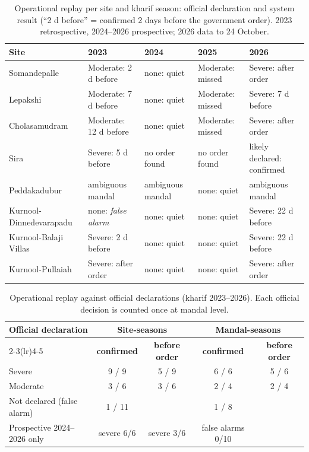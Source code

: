 \documentclass[11pt,a4paper,oneside]{article}
\begin{document}
\begin{table}[H]
\centering
\caption{Operational replay per site and kharif season: official declaration and system result (``2 d before'' = confirmed 2 days before the government order). 2023 retrospective, 2024--2026 prospective; 2026 data to 24 October.}
\label{tab:s_replay_sites}
\footnotesize
\begin{tabular}{@{}lllll@{}}
\toprule
\textbf{Site} & \textbf{2023} & \textbf{2024} & \textbf{2025} & \textbf{2026} \\
\midrule
Somandepalle & Moderate: 2 d before & none: quiet & Moderate: missed & Severe: after order \\
Lepakshi & Moderate: 7 d before & none: quiet & Moderate: missed & Severe: 7 d before \\
Cholasamudram & Moderate: 12 d before & none: quiet & Moderate: missed & Severe: after order \\
Sira & Severe: 5 d before & no order found & no order found & likely declared: confirmed \\
Peddakadubur & ambiguous mandal & ambiguous mandal & none: quiet & ambiguous mandal \\
Kurnool-Dinnedevarapadu & none: \textit{false alarm} & none: quiet & none: quiet & Severe: 22 d before \\
Kurnool-Balaji Villas & Severe: 2 d before & none: quiet & none: quiet & Severe: 22 d before \\
Kurnool-Pullaiah & Severe: after order & none: quiet & none: quiet & Severe: after order \\
\bottomrule
\end{tabular}
\end{table}


\begin{table}[H]
\centering
\caption{Operational replay against official declarations (kharif 2023--2026). Each official decision is counted once at mandal level.}
\label{tab:replay}
\small
\begin{tabular}{@{}lcccc@{}}
\toprule
\multirow{2}{*}{\textbf{Official declaration}} & \multicolumn{2}{c}{\textbf{Site-seasons}} & \multicolumn{2}{c}{\textbf{Mandal-seasons}} \\
\cmidrule(lr){2-3}\cmidrule(lr){4-5}
 & \textbf{confirmed} & \textbf{before order} & \textbf{confirmed} & \textbf{before order} \\
\midrule
Severe & 9 / 9 & 5 / 9 & 6 / 6 & 5 / 6 \\
Moderate & 3 / 6 & 3 / 6 & 2 / 4 & 2 / 4 \\
Not declared (false alarm) & 1 / 11 & & 1 / 8 & \\
Prospective 2024--2026 only & severe 6/6 & severe 3/6 & false alarms 0/10 & \\
\bottomrule
\end{tabular}
\end{table}
\end{document}
